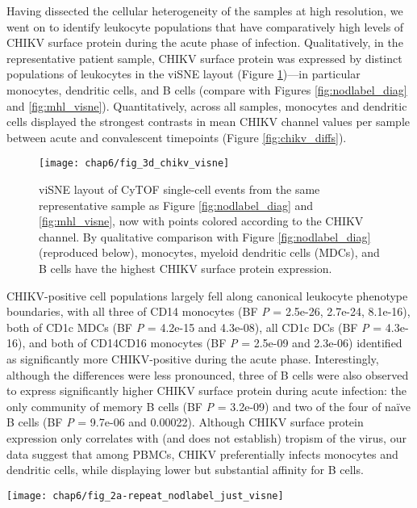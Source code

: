 Having dissected the cellular heterogeneity of the samples at high resolution, we went on to identify leukocyte populations that have comparatively high levels of CHIKV surface protein during the acute phase of infection. Qualitatively, in the representative patient sample, CHIKV surface protein was expressed by distinct populations of leukocytes in the viSNE layout (Figure \ref{fig:chikv_visne})—in particular monocytes, dendritic cells, and B cells (compare with Figures \ref{fig:nodlabel_diag} and \ref{fig:mhl_visne}). Quantitatively, across all samples, monocytes and dendritic cells displayed the strongest contrasts in mean CHIKV channel values per sample between acute and convalescent timepoints (Figure \ref{fig:chikv_diffs}).
\begin{figure}[htb]
  \centering
  \texttt{[image: chap6/fig\_3d\_chikv\_visne]}
  \caption[viSNE layout of CHIKV surface protein expression levels]{viSNE layout of CyTOF single-cell events from the same representative sample as Figure \ref{fig:nodlabel_diag} and \ref{fig:mhl_visne}, now with points colored according to the CHIKV channel. By qualitative comparison with Figure \ref{fig:nodlabel_diag} (reproduced below), monocytes, myeloid dendritic cells (MDCs), and B cells have the highest CHIKV surface protein expression. 
  }
  \label{fig:chikv_visne}
\end{figure}
CHIKV-positive cell populations largely fell along canonical leukocyte phenotype boundaries, with all three \subcommunities{} of CD14\sups{+} monocytes (BF \emph{P} = 2.5e-26, 2.7e-24, 8.1e-16), both \subcommunities{} of CD1c MDCs (BF \emph{P} = 4.2e-15 and 4.3e-08), all CD1c DCs (BF \emph{P} = 4.3e-16), and both \subcommunities{} of CD14\sups{+}\allowbreak CD16\sups{+} monocytes (BF \emph{P} = 2.5e-09 and 2.3e-06) identified as significantly more CHIKV-positive during the acute phase. Interestingly, although the differences were less pronounced, three \subcommunities{} of B cells were also observed to express significantly higher CHIKV surface protein during acute infection: the only community of memory B cells (BF \emph{P} = 3.2e-09) and two of the four \subcommunities{} of naïve B cells (BF \emph{P} = 9.7e-06 and 0.00022). Although CHIKV surface protein expression only correlates with (and does not establish) tropism of the virus, our data suggest that among PBMCs, CHIKV preferentially infects monocytes and dendritic cells, while displaying lower but substantial affinity for B cells.

\begin{marginfigure}[-16cm]
  \centering
  \texttt{[image: chap6/fig\_2a-repeat\_nodlabel\_just\_visne]}
\end{marginfigure}

